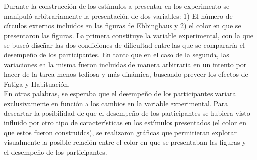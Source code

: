 Durante la construcción de los estímulos a presentar en los experimento se manipuló arbitrariamente la presentación de dos variables: 1) El número de círculos externos incluidos en las figuras de Ebbinghaus y 2) el color en que se presentaron las figuras. La primera constituye la variable experimental, con la que se buscó diseñar las dos condiciones de dificultad entre las que se compararía el desempeño de los participantes. En tanto que en el caso de la segunda, las variaciones en la misma fueron incluidas de manera arbitraria en un intento por hacer de la tarea menos tediosa y más dinámica, buscando preveer los efectos de Fatiga y Habituación.\\

En otras palabras, se esperaba que el desempeño de los participantes variara exclusivamente en función a los cambios en la variable experimental. Para descartar la posibilidad de que el desempeño de los participantes se hubiera visto influido por otro tipo de características en los estímulos presentados (el color en que estos fueron construidos), se realizaron gráficas que permitieran explorar visualmente la posible relación entre el color en que se presentaban las figuras y el desempeño de los participantes.\\

